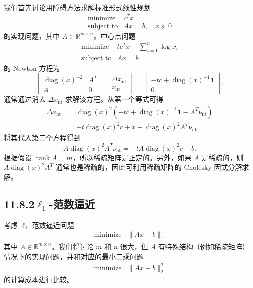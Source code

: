 \documentclass[UTF8,12pt,a4paper,fontset=fandol]{ctexart}
\begin{document}
我们首先讨论用障碍方法求解标准形式线性规划
\[
\begin{array}{ll}
\text{minimize} & c^Tx\\
\text{subject to} & Ax=b,\quad x\succeq 0
\end{array}
\]
的实现问题，其中 $A\in\mathbb{R}^{m\times n}$。中心点问题
\[
\begin{array}{ll}
\text{minimize} & tc^Tx-\displaystyle\sum_{i=1}^n\log x_i\\
\text{subject to} & Ax=b
\end{array}
\]
的 Newton 方程为
\[
\begin{bmatrix}
\operatorname{diag}(x)^{-2} & A^T\\
A & 0
\end{bmatrix}
\begin{bmatrix}
\Delta x_{\mathrm{nt}}\\
\nu_{\mathrm{nt}}
\end{bmatrix}
=
\begin{bmatrix}
-tc+\operatorname{diag}(x)^{-1}\mathbf{1}\\
0
\end{bmatrix}.
\]
通常通过消去 $\Delta x_{\mathrm{nt}}$ 求解该方程。从第一个等式可得
\[
\begin{aligned}
\Delta x_{\mathrm{nt}}
&=\operatorname{diag}(x)^2(-tc+\operatorname{diag}(x)^{-1}\mathbf{1}-A^T\nu_{\mathrm{nt}})\\
&=-t\operatorname{diag}(x)^2c+x-\operatorname{diag}(x)^2A^T\nu_{\mathrm{nt}}.
\end{aligned}
\]
将其代入第二个方程得到
\[
A\operatorname{diag}(x)^2A^T\nu_{\mathrm{nt}}
=-tA\operatorname{diag}(x)^2c+b.
\]
根据假设 $\operatorname{rank}A=m$，所以稀疏矩阵是正定的。另外，如果 $A$ 是稀疏的，则 $A\operatorname{diag}(x)^2A^T$ 通常也是稀疏的，因此可利用稀疏矩阵的 Cholesky 因式分解求解。

\subsection*{11.8.2\quad $\ell_1$-范数逼近}

考虑 $\ell_1$-范数逼近问题
\[
\begin{array}{ll}
\text{minimize} & \|Ax-b\|_1
\end{array}
\]
其中 $A\in\mathbb{R}^{m\times n}$。我们将讨论 $m$ 和 $n$ 很大，但 $A$ 有特殊结构（例如稀疏矩阵）情况下的实现问题，并和对应的最小二乘问题
\[
\begin{array}{ll}
\text{minimize} & \|Ax-b\|_2^2
\end{array}
\]
的计算成本进行比较。
\end{document}
